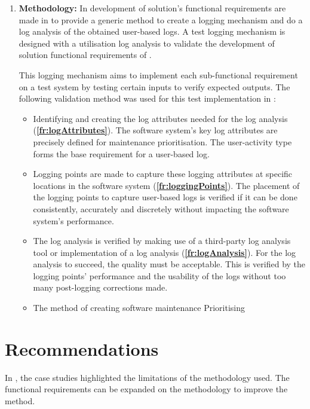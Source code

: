 \begin{enumerate}[label=\textbf{\Roman*.}]
	\item \textbf{Methodology:} In  development of solution's functional requirements are made in  to provide a generic method to create a logging mechanism and do a log analysis of the obtained user-based logs. A test logging mechanism is designed with a utilisation log analysis to validate the development of solution functional requirements of .\par This logging mechanism aims to implement each sub-functional requirement on a test system by testing certain inputs to verify expected outputs. The following validation method was used for this test implementation in :
		\begin{itemize}
			\item Identifying and creating the log attributes needed for the log analysis (\textbf{\ref{fr:logAttributes}}). The software system's key log attributes are precisely defined for maintenance prioritisation. The user-activity type forms the base requirement for a user-based log.
			
			\item Logging points are made to capture these logging attributes at specific locations in the software system (\textbf{\ref{fr:loggingPoints}}). The placement of the logging points to capture user-based logs is verified if it can be done consistently, accurately and discretely without impacting the software system's performance. 
			
			\item The log analysis is verified by making use of a third-party log analysis tool or implementation of a log analysis (\textbf{\ref{fr:logAnalysis}}). For the log analysis to succeed, the quality must be acceptable. This is verified by the logging points' performance and the usability of the logs without too many post-logging corrections made.
			
			\item The method of creating software maintenance Prioritising
		\end{itemize}
\end{enumerate}

\section{Recommendations}
In , the case studies highlighted the limitations of the methodology used. The functional requirements can be expanded on the methodology to improve the method.

